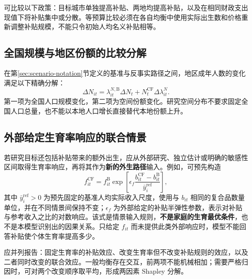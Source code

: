 \documentclass[UTF8,a4paper,zihao=-4,fontset=windows]{ctexart}
\numberwithin{equation}{section}
\newcommand{\B}{\mathrm B}
\newcommand{\CF}{\mathrm{CF}}
\begin{document}
可比较以下政策：目标城市单独提高补贴、两地均提高补贴，以及在相同财政支出现值下将补贴集中或分散。等预算比较必须在各自均衡中使用实际出生数和价格重新调整补贴规模，不能只令初始人均名义补贴相等。

\subsection{全国规模与地区份额的比较分解}
在第\ref{sec:scenario-notation}节定义的基准与反事实路径之间，地区成年人数的变化满足以下精确分解：
\begin{equation}
  \Delta N_{it}=\lambda^{N,\B}_{it}\Delta N_t
               +N_t^{\CF}\Delta\lambda^N_{it}.
  \label{eq:scale-share-decomposition}
\end{equation}
第一项为全国人口规模变化，第二项为空间份额变化。研究空间分布不要求固定全国人口总量，也不能以本地人口增长直接替代本地份额上升。

\subsection{外部给定生育率响应的联合情景}
若研究目标还包括补贴带来的额外出生，应从外部研究、独立估计或明确的敏感性区间取得生育率响应，再将其作为\textbf{新的外生路径}输入。例如，可预先构造
\begin{equation}
  f^{\CF}_{it}
   =f^\B_{it}\exp\!\left[
      \epsilon_f\frac{b^{\CF}_{it}-b^\B_{it}}{\bar y_i^{\mathrm{ref}}}
      \right],
  \label{eq:external-fertility-response}
\end{equation}
其中 $\bar y_i^{\mathrm{ref}}>0$ 为预先固定的基准人均实际收入尺度，使用与 $b_{it}$ 相同的复合品数量单位，并在不同情景间保持不变；$\epsilon_f$ 为外部给定的补贴半弹性参数，表示对补贴与参考收入之比的对数响应。该式是情景输入规则，\textbf{不是家庭的生育最优条件}，也不是本模型识别出的因果关系。只给定 $f_{it}$ 而未提供此类外部响应时，模型不能回答补贴使个体生育率提高多少。

应并列报告：固定生育率的补贴效应、改变生育率但不改变补贴规则的效应，以及二者同时改变的联合效应。一般均衡存在交互，前两项不能机械相加；需要严格归因时，可对两个改变顺序取平均，形成两因素 Shapley 分解。
\end{document}
